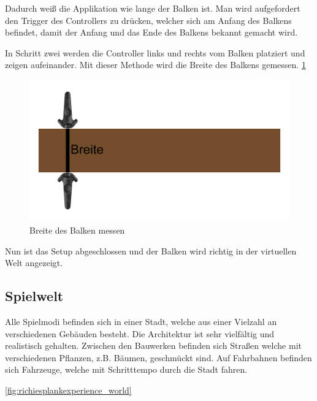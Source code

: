 Dadurch weiß die Applikation wie lange der Balken ist.
Man wird aufgefordert den Trigger des Controllers zu drücken, welcher sich am Anfang des Balkens befindet, damit der Anfang und das Ende des Balkens bekannt gemacht wird.



In Schritt zwei werden die Controller links und rechts vom Balken platziert und zeigen aufeinander.
Mit dieser Methode wird die Breite des Balkens gemessen.
\ref{fig:beam_width_measurement} %

\begin {figure}
    \includegraphics[scale=0.18]{pics/beam_width_measurement}
    \caption{Breite des Balken messen}
    \label{fig:beam_width_measurement}
\end {figure}


Nun ist das Setup abgeschlossen und der Balken wird richtig in der virtuellen Welt angezeigt.
~\cite{ToastGames_2021_Setup}

\subsection{Spielwelt}
\label{sec:richiesplankexperience_world}
Alle Spielmodi befinden sich in einer Stadt, welche aus einer Vielzahl an verschiedenen Gebäuden besteht.
Die Architektur ist sehr vielfältig und realistisch gehalten.
Zwischen den Bauwerken befinden sich Straßen welche mit verschiedenen Pflanzen, z.B. Bäumen, geschmückt sind.
Auf Fahrbahnen befinden sich Fahrzeuge, welche mit Schritttempo durch die Stadt fahren.

\ref{fig:richiesplankexperience_world} %

